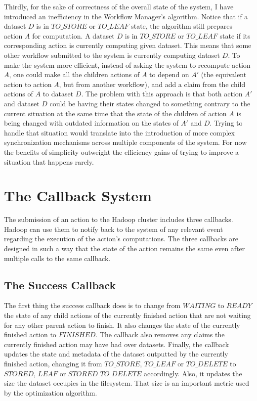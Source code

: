 Thirdly, for the sake of correctness of the overall state of the system, I have introduced an inefficiency in the Workflow Manager's algorithm. Notice that if a dataset $D$ is in $TO\_STORE$ or $TO\_LEAF$ state, the algorithm still prepares action $A$ for computation. A dataset $D$ is in $TO\_STORE$ or $TO\_LEAF$ state if its corresponding action is currently computing given dataset. This means that some other workflow submitted to the system is currently computing dataset $D$. To make the system more efficient, instead of asking the system to recompute action $A$, one could make all the children actions of $A$ to depend on $A'$ (the equivalent action to action $A$, but from another workflow), and add a claim from the child actions of $A$ to dataset $D$. The problem with this approach is that both action $A'$ and dataset $D$ could be having their states changed to something contrary to the current situation at the same time that the state of the children of action $A$ is being changed with outdated information on the states of $A'$ and $D$. Trying to handle that situation would translate into the introduction of more complex synchronization mechanisms across multiple components of the system. For now the benefits of simplicity outweight the efficiency gains of trying to improve a situation that happens rarely.

\section{The Callback System}
\label{sec:callback_system}
The submission of an action to the Hadoop cluster includes three callbacks. Hadoop can use them to notify back to the system of any relevant event regarding the execution of the action's computations. The three callbacks are designed in such a way that the state of the action remains the same even after multiple calls to the same callback.

\subsection{The Success Callback}
The first thing the success callback does is to change from $WAITING$ to $READY$ the state of any child actions of the currently finished action that are not waiting for any other parent action to finish. It also changes the state of the currently finished action to $FINISHED$. The callback also removes any claims the currently finished action may have had over datasets. Finally, the callback updates the state and metadata of the dataset outputted by the currently finished action, changing it from $TO\_STORE$, $TO\_LEAF$ or $TO\_DELETE$ to $STORED$, $LEAF$ or $STORED\_TO\_DELETE$ accordingly. Also, it updates the size the dataset occupies in the filesystem. That size is an important metric used by the optimization algorithm.

